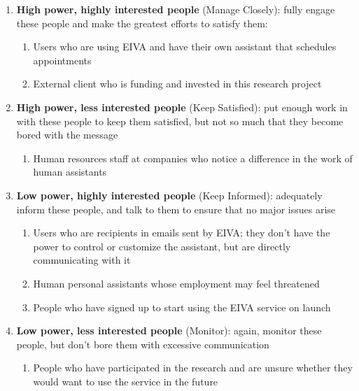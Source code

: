 \documentclass{article}
\begin{document}
\begin{enumerate}
	\item \textbf{High power, highly interested people} (Manage Closely): fully engage these people and make the greatest efforts to satisfy them:
	      \begin{enumerate}
	      	\item Users who are using EIVA and have their own assistant that schedules appointments
	      	\item External client who is funding and invested in this research project
	      \end{enumerate}
	\item \textbf{High power, less interested people} (Keep Satisfied): put enough work in with these people to keep them satisfied, but not so much that they become bored with the message
	      \begin{enumerate}
	      	\item Human resources staff at companies who notice a difference in the work of human assistants
	      \end{enumerate}
	\item \textbf{Low power, highly interested people} (Keep Informed): adequately inform these people, and talk to them to ensure that no major issues arise
	      \begin{enumerate}
	      	\item Users who are recipients in emails sent by EIVA; they don't have the power to control or customize the assistant, but are directly communicating with it
	      	\item Human personal assistants whose employment may feel threatened
	      	\item People who have signed up to start using the EIVA service on launch
	      \end{enumerate}
	\item \textbf{Low power, less interested people} (Monitor): again, monitor these people, but don’t bore them with excessive communication
	      \begin{enumerate}
	      	\item People who have participated in the research and are unsure whether they would want to use the service in the future
	      \end{enumerate}
\end{enumerate}
\end{document}
